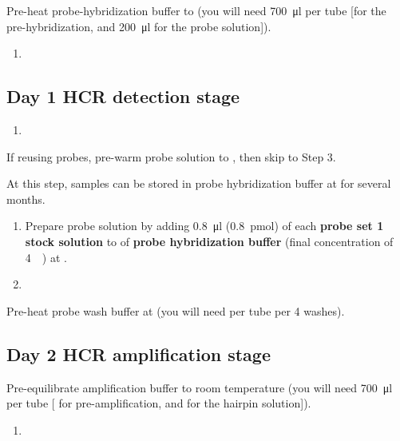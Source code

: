 \documentclass[12pt]{report}
\begin{document}
\bigskip\alert{Pre-heat probe-hybridization buffer to \thirtysevendegree{} (you will need \qty{700}{\ul} per tube [\fivehunmicrol for the pre-hybridization, and \qty{200}{\ul} for the probe solution]).}

\begin{enumerate}[resume = steps]
	\item {}
\end{enumerate}


\subsection*{Day 1 \textendash{} HCR detection stage}
\begin{enumerate}[series = steps]
	\item {}
\end{enumerate}

\bigskip\alert{If reusing probes, pre-warm probe solution to \thirtysevendegree, then skip to Step 3.}

\alert{At this step, samples can be stored in probe hybridization buffer at \minustwenty{} for several months.}

\begin{enumerate}[resume = steps]
	\item Prepare probe solution by adding \qty{0.8}{\ul} (\qty{0.8}{\pmol}) of each \textbf{probe set \qty{1}{\micro\molar} stock solution} to \twohunmicrol{} of \textbf{probe hybridization buffer} (final concentration of \qty{4}{\nano\molar}) at \thirtysevendegree.\\
	\item {}
\end{enumerate}

\bigskip\alert{Pre-heat probe wash buffer at \thirtysevendegree{} (you will need \fivehunmicrol per tube per 4 washes).}


\subsection*{Day 2 \textendash{} HCR amplification stage}

\alert{Pre-equilibrate amplification buffer to room temperature (you will need \qty{700}{\ul} per tube [\fivehunmicrol{} for pre-amplification, and \twohunmicrol{} for the hairpin solution]).}
\begin{enumerate}[series = steps]
	\item {}
\end{enumerate}
\end{document}

